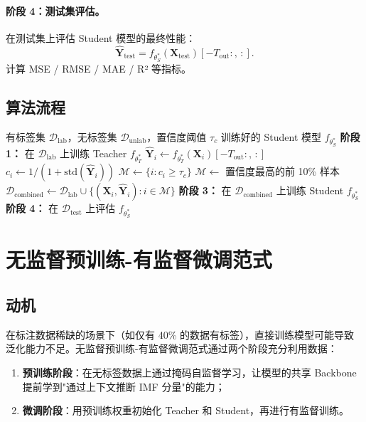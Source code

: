 \documentclass[11pt,a4paper]{article}
\newcommand{\mat}[1]{\bm{#1}}
\begin{document}
\paragraph{阶段 4：测试集评估。}
在测试集上评估 Student 模型的最终性能：
\[
\widehat{\mat{Y}}_{\text{test}} = f_{\theta_S^*}(\mat{X}_{\text{test}})[-T_{\text{out}}:,\, :].
\]
计算 MSE / RMSE / MAE / R² 等指标。

\subsection{算法流程}
\begin{algorithm}[ht]
\caption{伪标签半监督训练流程}
\begin{algorithmic}[1]
\REQUIRE 有标签集 $\mathcal{D}_{\text{lab}}$，无标签集 $\mathcal{D}_{\text{unlab}}$，置信度阈值 $\tau_c$
\ENSURE 训练好的 Student 模型 $f_{\theta_S^*}$
\STATE \textbf{阶段 1：} 在 $\mathcal{D}_{\text{lab}}$ 上训练 Teacher $f_{\theta_T^*}$
\FOR{每个样本 $\mat{X}_i \in \mathcal{D}_{\text{unlab}}$}
  \STATE $\widehat{\mat{Y}}_i \gets f_{\theta_T^*}(\mat{X}_i)[-T_{\text{out}}:,\, :]$
  \STATE $c_i \gets 1 / (1 + \mathrm{std}(\widehat{\mat{Y}}_i))$
\ENDFOR
\STATE $\mathcal{M} \gets \{i : c_i \ge \tau_c\}$
  \STATE $\mathcal{M} \gets$ 置信度最高的前 10\% 样本
\ENDIF
\STATE $\mathcal{D}_{\text{combined}} \gets \mathcal{D}_{\text{lab}} \cup \{(\mat{X}_i, \widehat{\mat{Y}}_i) : i \in \mathcal{M}\}$
\STATE \textbf{阶段 3：} 在 $\mathcal{D}_{\text{combined}}$ 上训练 Student $f_{\theta_S^*}$
\STATE \textbf{阶段 4：} 在 $\mathcal{D}_{\text{test}}$ 上评估 $f_{\theta_S^*}$
\end{algorithmic}
\end{algorithm}

\section{无监督预训练-有监督微调范式}

\subsection{动机}
在标注数据稀缺的场景下（如仅有 40\% 的数据有标签），直接训练模型可能导致
泛化能力不足。无监督预训练-有监督微调范式通过两个阶段充分利用数据：
\begin{enumerate}[leftmargin=*]
  \item \textbf{预训练阶段}：在无标签数据上通过掩码自监督学习，让模型的共享 Backbone
        提前学到"通过上下文推断 IMF 分量"的能力；
  \item \textbf{微调阶段}：用预训练权重初始化 Teacher 和 Student，再进行有监督训练。
\end{enumerate}
\end{document}

